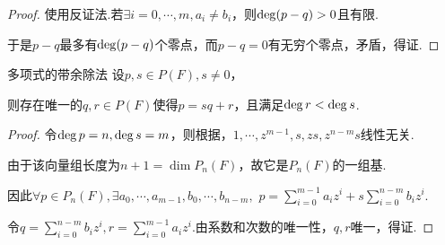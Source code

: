 \begin{proof}
    使用反证法.若\(\exists i=0,\cdots,m,a_i \ne b_i\)，则\(\operatorname{deg} (p-q)>0\)且有限.

    于是\(p-q\)最多有\(\operatorname{deg} (p-q)\)个零点，而\(p-q=0\)有无穷个零点，矛盾，得证.
\end{proof}

\begin{theorem}[4.9*]\label{thm 4.9*} 多项式的带余除法 \:
    设\(p,s \in P(F),s \ne 0\)，

    则存在唯一的\(q,r \in P(F)\)使得\(p=sq+r\)，且满足\(\operatorname{deg} r<\operatorname{deg} s\).
\end{theorem}

\begin{proof}
    令\(\operatorname{deg} p=n,\operatorname{deg} s=m\)，则根据，\(1,\cdots,z^{m-1},s,zs,z^{n-m}s\)线性无关.

    由于该向量组长度为\(n+1=\dim P_n(F)\)，故它是\(P_n(F)\)的一组基.
    
    因此\(\forall p \in P_n(F),\exists a_0,\cdots,a_{m-1},b_0,\cdots,b_{n-m},\)
    \(p=\sum_{i=0}^{m-1}a_iz^i+s\sum_{i=0}^{n-m}b_iz^i\).
    
    令\(q=\sum_{i=0}^{n-m}b_iz^i,r=\sum_{i=0}^{m-1}a_iz^i\).由系数和次数的唯一性，\(q,r\)唯一，得证.
\end{proof}

